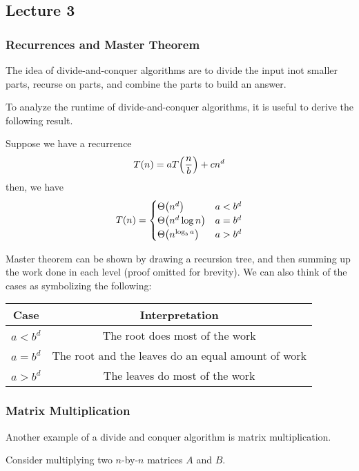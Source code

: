 \subsection{Lecture 3}

\subsubsection{Recurrences and Master Theorem}
The idea of divide-and-conquer algorithms are to
divide the input inot smaller parts, recurse on parts,
and combine the parts to build an answer.

To analyze the runtime of divide-and-conquer algorithms, it is
useful to derive the following result.

\begin{theorem} 
    Suppose we have a recurrence
    \[ T(n) = a T\qty(\frac{n}{b}) + cn^d \]
    then, we have
    \[ T(n) = \begin{cases}
        \Theta\qty(n^d) & a < b^d \\
        \Theta\qty(n^d \log n) & a = b^d \\
        \Theta\qty(n^{\log_b a}) & a > b^d
    \end{cases} \]
\end{theorem}

Master theorem can be shown by drawing a recursion tree,
and then summing up the work done in each level (proof omitted for brevity).
We can also think of the cases as symbolizing the following:

\begin{center}
\begin{tabular}{ c|c }
    Case & Interpretation \\ \hline
    $a < b^d$ & The root does most of the work \\ \hline
    $a = b^d$ & The root and the leaves do an equal amount of work \\ \hline
    $a > b^d$ & The leaves do most of the work \\ \hline
\end{tabular}
\end{center}

\subsubsection{Matrix Multiplication}
Another example of a divide and conquer algorithm is matrix multiplication.

Consider multiplying two $n$-by-$n$ matrices $A$ and $B$.

